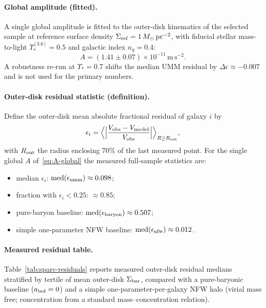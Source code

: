 \documentclass[11pt,a4paper]{article}
\begin{document}
\paragraph{Global amplitude (fitted).}
A single global amplitude is fitted to the outer-disk kinematics of the selected sample at reference surface density \(\Sigma_{\rm ref}=1\,M_\odot\,\mathrm{pc^{-2}}\), with fiducial stellar mass-to-light \(\Upsilon_*^{[3.6]}=0.5\) and galactic index \(n_g=0.4\):
\begin{equation}
A=(1.41\pm 0.07)\times 10^{-11}\,\mathrm{m\,s^{-2}}.
\label{eq:A-global}
\end{equation}
A robustness re-run at \(\Upsilon_*=0.7\) shifts the median UMM residual by \(\Delta\epsilon\approx -0.007\) and is not used for the primary numbers.

\paragraph{Outer-disk residual statistic (definition).}
Define the outer-disk mean absolute fractional residual of galaxy \(i\) by
\begin{equation}
\epsilon_i
=\Bigl\langle
\Bigl|\frac{V_{\rm obs}-V_{\rm model}}{V_{\rm obs}}\Bigr|
\Bigr\rangle_{R\geq R_{\rm out}},
\label{eq:epsilon}
\end{equation}
with \(R_{\rm out}\) the radius enclosing 70\% of the last measured point. For the single global \(A\) of~\eqref{eq:A-global} the measured full-sample statistics are:
\begin{itemize}[leftmargin=*]
\item median \(\epsilon_i\): \(\mathrm{med}(\epsilon_{\rm umm})\approx 0.098\);
\item fraction with \(\epsilon_i<0.25\): \(\approx 0.85\);
\item pure-baryon baseline: \(\mathrm{med}(\epsilon_{\rm baryon})\approx 0.507\);
\item simple one-parameter NFW baseline: \(\mathrm{med}(\epsilon_{\rm nfw})\approx 0.012\).
\end{itemize}

\paragraph{Measured residual table.}
Table~\ref{tab:sparc-residuals} reports measured outer-disk residual medians stratified by tertile of mean outer-disk \(\Sigma_{\rm bar}\), compared with a pure-baryonic baseline (\(a_{\rm ind}=0\)) and a simple one-parameter-per-galaxy NFW halo (virial mass free; concentration from a standard mass--concentration relation).
\end{document}
